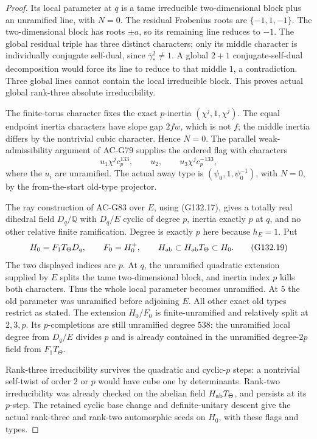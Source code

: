 \begin{proof}
Its local parameter at \(q\) is a tame irreducible
two-dimensional block plus an unramified line, with \(N=0\).
The residual Frobenius roots are \(\{-1,1,-1\}\).
The two-dimensional block has roots \(\pm a\), so its
remaining line reduces to \(-1\).
The global residual triple has three distinct characters;
only its middle character is individually conjugate self-dual,
since \(\bar\gamma_*^2\ne1\).
A global \(2+1\) conjugate-self-dual decomposition would
force its line to reduce to that middle \(1\), a contradiction.
Three global lines cannot contain the local irreducible block.
This proves actual global rank-three absolute irreducibility.

The finite-torus character fixes the exact \(p\)-inertia
\((\chi^j,1,\chi^j)\).
The equal endpoint inertia characters have slope gap \(2fw\),
which is not \(f\); the middle inertia differs by the
nontrivial cubic character.  Hence \(N=0\).
The parallel weak-admissibility argument of AC-G79 supplies
the ordered flag with characters
\[
 u_1\chi^j c_p^{133},\qquad u_2,\qquad
 u_3\chi^j c_p^{-133},
 \tag{G132.18}
\]
where the \(u_i\) are unramified.
The actual away type is \((\psi_0,1,\psi_0^{-1})\), with
\(N=0\), by the from-the-start old-type projector.

The ray construction of AC-G83 over \(E\), using (G132.17),
gives a totally real dihedral field \(D_q/\mathbb Q\) with
\(D_q/E\) cyclic of degree \(p\), inertia exactly \(p\) at \(q\),
and no other relative finite ramification.
Degree is exactly \(p\) here because \(h_E=1\).
Put
\[
 H_0=F_1T_\Theta D_q,\qquad F_0=H_0^+,\qquad
 H_{\rm ab}\subset H_{\rm ab}T_\Theta\subset H_0 .
 \tag{G132.19}
\]
The two displayed indices are \(p\).
At \(q\), the unramified quadratic extension supplied by
\(E\) splits the tame two-dimensional block, and inertia
index \(p\) kills both characters.  Thus the whole local
parameter becomes unramified.  At \(5\) the old parameter
was unramified before adjoining \(E\).
All other exact old types restrict as stated.
The extension \(H_0/F_0\) is finite-unramified and relatively
split at \(2,3,p\).
Its \(p\)-completions are still unramified degree \(538\):
the unramified local degree from \(D_q/E\) divides \(p\)
and is already contained in the unramified degree-\(2p\)
field from \(F_1T_\Theta\).

Rank-three irreducibility survives the quadratic and
cyclic-\(p\) steps: a nontrivial self-twist of order \(2\)
or \(p\) would have cube one by determinants.
Rank-two irreducibility was already checked on the abelian
field \(H_{\rm ab}T_\Theta\), and persists at its \(p\)-step.
The retained cyclic base change and definite-unitary descent
give the actual rank-three and rank-two automorphic seeds on
\(H_0\), with these flags and types.


\end{proof}
